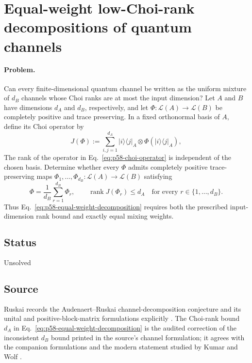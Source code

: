 \section{Equal-weight low-Choi-rank decompositions of quantum channels}
\label{sec:op_523ed75735cfe6c3}

\paragraph{Problem.}
Can every finite-dimensional quantum channel be written as the uniform
mixture of $d_B$ channels whose Choi ranks are at most the input dimension?
Let $A$ and $B$ have dimensions $d_A$ and $d_B$, respectively, and let
$\Phi:\mathcal L(A)\to\mathcal L(B)$ be completely positive and trace
preserving.  In a fixed orthonormal basis of $A$, define its Choi operator by
\begin{equation}
  J(\Phi)
  :=\sum_{i,j=1}^{d_A}
      \lvert i\rangle\!\langle j\rvert_A\otimes
      \Phi\!\left(\lvert i\rangle\!\langle j\rvert_A\right),
  \label{eq:p58-choi-operator}
\end{equation}
The rank of the operator in Eq.~\eqref{eq:p58-choi-operator} is independent
of the chosen basis.  Determine whether every $\Phi$ admits completely
positive trace-preserving maps
$\Phi_1,\ldots,\Phi_{d_B}:\mathcal L(A)\to\mathcal L(B)$ satisfying
\begin{equation}
  \Phi=\frac1{d_B}\sum_{r=1}^{d_B}\Phi_r,
  \qquad
  \operatorname{rank}J(\Phi_r)\leq d_A
  \quad\text{for every }r\in\{1,\ldots,d_B\}.
  \label{eq:p58-equal-weight-decomposition}
\end{equation}
Thus Eq.~\eqref{eq:p58-equal-weight-decomposition} requires both the
prescribed input-dimension rank bound and exactly equal mixing weights.

\subsection*{Status}

Unsolved

\subsection*{Source}

Ruskai records the Audenaert--Ruskai channel-decomposition conjecture and its
unital and positive-block-matrix formulations explicitly
.  The Choi-rank bound $d_A$ in
Eq.~\eqref{eq:p58-equal-weight-decomposition} is the audited correction of
the inconsistent $d_B$ bound printed in the source's channel formulation;
it agrees with the companion formulations and the modern statement studied
by Kumar and Wolf .

